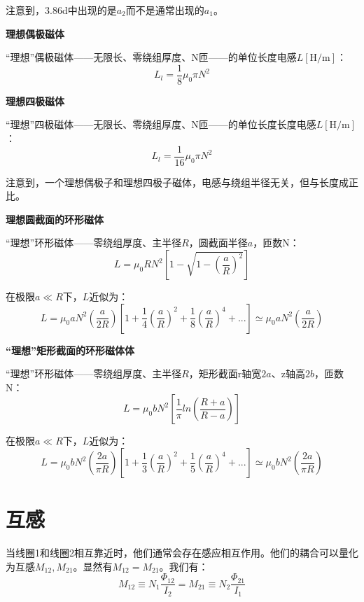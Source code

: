 注意到，3.86d中出现的是$a_2$而不是通常出现的$a_1$。

\textbf{理想偶极磁体}

  “理想”偶极磁体——无限长、零绕组厚度、N匝——的单位长度电感$L\mathrm{[H/m]}$：
  \begin{equation}
L_l=\frac{1}{8}\mu_0\pi N^2%
\end{equation}

\textbf{理想四极磁体}

  “理想”四极磁体——无限长、零绕组厚度、N匝——的单位长度长度电感$L\mathrm{[H/m]}$：
  \begin{equation}
L_l=\frac{1}{16}\mu_0\pi N^2%
\end{equation}

注意到，一个理想偶极子和理想四极子磁体，电感与绕组半径无关，但与长度成正比。

\textbf{理想圆截面的环形磁体}

  “理想”环形磁体——零绕组厚度、主半径$R$，圆截面半径$a$，匝数N：
  \begin{equation}
 L=\mu_0RN^2[1-\sqrt{1-(\frac{a}{R})^2}]%
\end{equation}

在极限$a\ll R$下，$L$近似为：
\begin{equation}
 L=\mu_0aN^2(\frac{a}{2R})[1+\frac{1}{4}(\frac{a}{R})^2+\frac{1}{8}(\frac{a}{R})^4+...]\simeq\mu_0aN^2(\frac{a}{2R})%
\end{equation}

\textbf{“理想”矩形截面的环形磁体体}

“理想”环形磁体——零绕组厚度、主半径$R$，矩形截面r轴宽$2a$、z轴高$2b$，匝数N：
  \begin{equation}
L=\mu_0bN^2[\frac{1}{\pi}ln(\frac{R+a}{R-a})]%
\end{equation}

在极限$a\ll R$下，$L$近似为：
\begin{equation}
L=\mu_0bN^2(\frac{2a}{\pi R})[1+\frac{1}{3}(\frac{a}{R})^2+\frac{1}{5}(\frac{a}{R})^4+...]\simeq\mu_0bN^2(\frac{2a}{\pi R})%
\end{equation}



\section{互感}
当线圈1和线圈2相互靠近时，他们通常会存在感应相互作用。他们的耦合可以量化为互感$M_{12},M_{21}$。显然有$M_{12}=M_{21}$。我们有：
\begin{equation}
M_{12}\equiv N_1\frac{\Phi_{12}}{I_2}=M_{21}\equiv N_2\frac{\Phi_{21}}{I_1}%
\end{equation}

